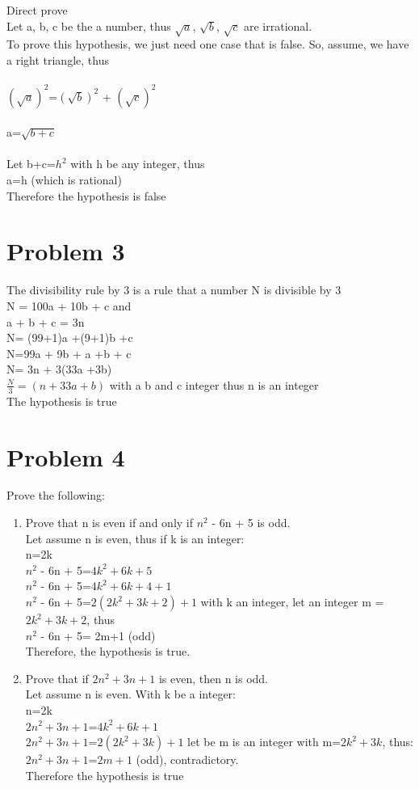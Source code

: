 \documentclass[12pt,letterpaper]{article}
\begin{document}
\begin{enumerate}
Direct prove\\
Let a, b, c be the a number, thus \(\sqrt{a}\), \(\sqrt{b}\), \(\sqrt{c}\) are irrational.
\\ To prove this hypothesis, we just need one case that is false. So, assume, we have
a right triangle, thus\\\\
\((\sqrt{a})^2\)=\((\sqrt{b})^2\) + \((\sqrt{c})^2\)\\\\
a=\(\sqrt{b+c}\)\\\\
Let b+c=\(h^2\) with h be any integer, thus\\
a=h (which is rational)\\
Therefore the hypothesis is false
\end{enumerate}
\section*{Problem 3}
The divisibility rule by 3 is a rule that a number N is divisible by 3\\
N = 100a + 10b + c and \\
a + b + c = 3n\\
N= (99+1)a +(9+1)b +c\\
N=99a + 9b + a +b + c\\
N= 3n + 3(33a +3b)\\
\(\frac{N}{3}=(n+33a+b)\) with a b and c integer thus n is an integer\\
The hypothesis is true

\section*{Problem 4}
Prove the following:
\begin{enumerate}
  \item Prove that n is even if and only if \(n^2\) - 6n + 5 is odd.\\
  Let assume n is even, thus if k is an integer:\\
  n=2k\\
  \(n^2\) - 6n + 5=\(4k^2+6k+5\)\\
  \(n^2\) - 6n + 5=\(4k^2+6k+4+1\)\\
  \(n^2\) - 6n + 5=\(2(2k^2+3k+2)+1\) with k an integer, let an integer m =\(2k^2+3k+2\), thus \\
  \(n^2\) - 6n + 5= 2m+1 (odd)\\
  Therefore, the hypothesis is true.
  \item Prove that if \(2n^2 + 3n + 1\) is even, then n is odd.\\
  Let assume n is even. With k be a integer:\\
  n=2k\\
  \(2n^2 + 3n + 1\)=\(4k^2 + 6k + 1\)\\
  \(2n^2 + 3n + 1\)=\(2(2k^2 + 3k) + 1\) let be m is an integer with m=\(2k^2 + 3k\), thus:\\
  \(2n^2 + 3n + 1\)=\(2m+ 1\) (odd), contradictory.\\
  Therefore the hypothesis is true
\end{enumerate}
\end{document}

